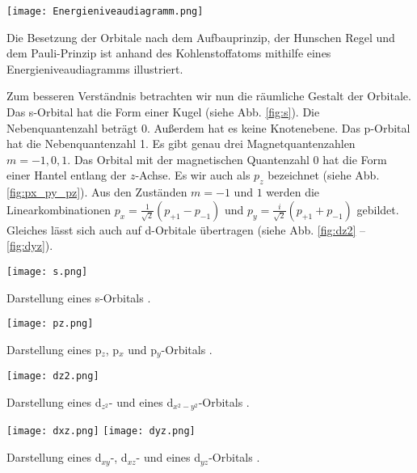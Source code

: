 \begin{dsafigure}
 \centering
 \texttt{[image: Energieniveaudiagramm.png]}
 \caption{Die Besetzung der Orbitale nach dem Aufbauprinzip, der Hunschen Regel und dem Pauli-Prinzip ist anhand des Kohlenstoffatoms mithilfe eines Energieniveaudiagramms illustriert.}
 \label{fig:Energieniveaudiagramm}
\end{dsafigure}

Zum besseren Verständnis betrachten wir nun die räumliche Gestalt der Orbitale.
Das s-Orbital hat die Form einer Kugel (siehe Abb. \ref{fig:s}).
Die Nebenquantenzahl beträgt $0$. Außerdem hat es keine Knotenebene. Das
p-Orbital hat die Nebenquantenzahl 1. Es gibt genau drei Magnetquantenzahlen
$m = -1, 0, 1$. Das Orbital mit der magnetischen Quantenzahl $0$ hat die Form
einer Hantel entlang der $z$-Achse. Es wir auch als $p_{z}$ bezeichnet
(siehe Abb. \ref{fig:px_py_pz}). Aus den Zuständen $m = -1$ und $1$ werden
die Linearkombinationen $p_{x} = \frac{1}{\sqrt{2}} (p_{+1} - p_{-1})$
und $p_{y} = \frac{i}{\sqrt{2}}(p_{+1}+p_{-1})$
gebildet. Gleiches lässt sich auch auf
d-Orbitale übertragen (siehe Abb. \ref{fig:dz2} -- \ref{fig:dyz}).

\begin{dsafigure}
 \centering
 \texttt{[image: s.png]}
 \caption{Darstellung eines s-Orbitals \cite{ADF2017authors}.}
 \label{fig:s}
\end{dsafigure}

\begin{dsafigure}
 \centering
 \texttt{[image: pz.png]}
 \caption{Darstellung eines p$_{z}$, p$_{x}$ und p$_{y}$-Orbitals \cite{ADF2017authors}.}
 \label{fig:px_py_pz}
\end{dsafigure}

\begin{dsafigure}
 \centering
 \hfill
 \texttt{[image: dz2.png]}
 \hfill
 \hfill
 \caption{Darstellung eines d$_{z^{2}}$- und eines d$_{x^{2}-y^{2}}$-Orbitals
          \cite{ADF2017authors}.}
 \label{fig:dz2}
\end{dsafigure}

\begin{dsafigure}
 \centering
 \hfill
 \hfill
 \texttt{[image: dxz.png]}
 \hfill
 \texttt{[image: dyz.png]}
 \hfill
 \caption{Darstellung eines d$_{xy}$-, d$_{xz}$- und eines
          d$_{yz}$-Orbitals \cite{ADF2017authors}.}
 \label{fig:dxy_xz_yz}
\end{dsafigure}

